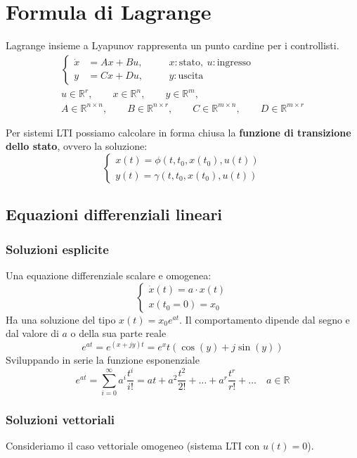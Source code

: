\documentclass[a4paper,12pt]{article}
\begin{document}
	\section{Formula di Lagrange}
	Lagrange insieme a Lyapunov rappresenta un punto cardine per i controllisti.
	\begin{gather*}
		\left\{
		\begin{aligned}
			\dot{x} &= Ax + Bu, && \quad x : \text{stato}, \ u : \text{ingresso} \\
			y &= Cx + Du, && \quad y : \text{uscita}
		\end{aligned}
		\right. \\[15pt]
		u \in \mathbb{R}^r, \qquad x \in \mathbb{R}^n, \qquad y \in \mathbb{R}^m, \\
		A \in \mathbb{R}^{n \times n}, \qquad B \in \mathbb{R}^{n \times r}, \qquad C \in \mathbb{R}^{m \times n}, \qquad D \in \mathbb{R}^{m \times r}
	\end{gather*}
	
	Per sistemi LTI possiamo calcolare in forma chiusa la \textbf{funzione di transizione dello stato}, ovvero la soluzione:
	\[
	\begin{cases}
		x(t) = \phi(t, t_0, x(t_0), u(t)) \\
		y(t) = \gamma(t, t_0, x(t_0), u(t))
	\end{cases}
	\]
	\subsection{Equazioni differenziali lineari}
	\subsubsection{Soluzioni esplicite}
	Una equazione differenziale scalare e omogenea:
	\[
	\begin{cases}
		\dot{x}(t) = a \cdot x(t) \\
		x(t_0 = 0) = x_0
	\end{cases}
	\]
	Ha una soluzione del tipo $x(t) = x_0e^{at}$.
	Il comportamento dipende dal segno e dal valore di $a$ o della sua parte reale
	\[
		e^{at} = e^{(x+jy)t} = e^xt(\cos(y) + j\sin(y))
	\]
	Sviluppando in serie la funzione esponenziale
	\[
	e^{at} = \sum_{i = 0}^{\infty} a^i\frac{t^i}{i!} = at + a^2\frac{t^2}{2!} + \dots + a^r \frac{t^r}{r!} + \dots \quad a \in \mathbb{R}
	\]
	\subsubsection{Soluzioni vettoriali}
	Consideriamo il caso vettoriale omogeneo (sistema LTI con $u(t) = 0$).
	
\end{document}
